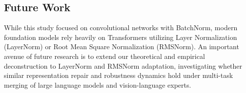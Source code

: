 \documentclass{article}
\begin{document}
\subsection{Future Work}
While this study focused on convolutional networks with BatchNorm, modern foundation models rely heavily on Transformers utilizing Layer Normalization (LayerNorm) or Root Mean Square Normalization (RMSNorm). An important avenue of future research is to extend our theoretical and empirical deconstruction to LayerNorm and RMSNorm adaptation, investigating whether similar representation repair and robustness dynamics hold under multi-task merging of large language models and vision-language experts.



\end{document}
